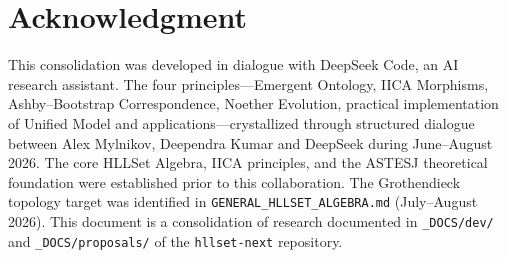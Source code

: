 \documentclass[11pt,a4paper]{article}
\theoremstyle{remark}
\begin{document}
\section*{Acknowledgment}
This consolidation was developed in dialogue with DeepSeek Code, an AI research
assistant. The four principles---Emergent Ontology, IICA Morphisms, Ashby--Bootstrap
Correspondence, Noether Evolution, practical implementation of Unified Model and applications---crystallized through structured dialogue between
Alex Mylnikov, Deependra Kumar and DeepSeek during June--August 2026. The core HLLSet Algebra, IICA
principles, and the ASTESJ theoretical foundation were established prior to this
collaboration. The Grothendieck topology target was identified in
\texttt{GENERAL\_HLLSET\_ALGEBRA.md} (July--August 2026). This document is a
consolidation of research documented in \texttt{\_DOCS/dev/} and
\texttt{\_DOCS/proposals/} of the \texttt{hllset-next} repository.
\end{document}

